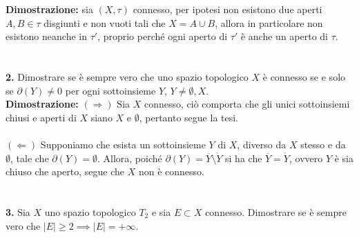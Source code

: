 \documentclass{article}
\begin{document}
\textbf{Dimostrazione:} sia $(X, \tau)$ connesso, per ipotesi non esistono due aperti $A, B \in \tau$ disgiunti e non vuoti tali che $X = A \cup B$, allora in particolare non esistono neanche in $\tau'$, proprio perché ogni aperto di $\tau'$ è anche un aperto di $\tau$. \\ \\ \\
\textbf{2.} Dimostrare se è sempre vero che uno spazio topologico $X$ è connesso se e solo se $\partial(Y) \neq 0$ per ogni sottoinsieme $Y$, $Y \neq \emptyset, X$. \\

\textbf{Dimostrazione:} $(\Rightarrow)$ Sia $X$ connesso, ciò comporta che gli unici sottoinsiemi chiusi e aperti di $X$ siano $X$ e $\emptyset$, pertanto segue la tesi. \\ \\
$(\Leftarrow)$ Supponiamo che esista un sottoinsieme $Y$ di $X$, diverso da $X$ stesso e da $\emptyset$, tale che $\partial(Y) = \emptyset$. Allora, poiché $\partial(Y) = \overline{Y} \setminus \mathring{Y}$ si ha che $\overline{Y} = \mathring{Y}$, ovvero $Y$ è sia chiuso che aperto, segue che $X$ non è connesso. \\ \\ \\
\textbf{3.} Sia $X$ uno spazio topologico $T_2$ e sia $E \subset X$ connesso. Dimostrare se è sempre vero che $|E| \geq 2 \implies |E| = +\infty$. \\
\end{document}
